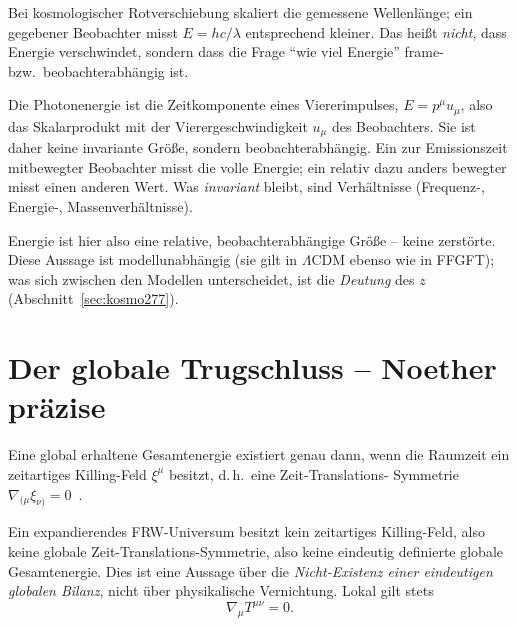 Bei kosmologischer Rotverschiebung skaliert die gemessene Wellenlänge; ein
gegebener Beobachter misst $E = hc/\lambda$ entsprechend kleiner. Das heißt
\emph{nicht}, dass Energie verschwindet, sondern dass die Frage \enquote{wie
viel Energie} frame- bzw.\ beobachterabhängig ist.

\begin{proposition}\label{prop:frame277}
Die Photonenergie ist die Zeitkomponente eines Viererimpulses,
$E = p^\mu u_\mu$, also das Skalarprodukt mit der Vierergeschwindigkeit $u_\mu$
des Beobachters. Sie ist daher keine invariante Größe, sondern
beobachterabhängig. Ein zur Emissionszeit mitbewegter Beobachter misst die
volle Energie; ein relativ dazu anders bewegter misst einen anderen Wert. Was
\emph{invariant} bleibt, sind Verhältnisse (Frequenz-, Energie-,
Massenverhältnisse).
\end{proposition}

Energie ist hier also eine relative, beobachterabhängige Größe -- keine
zerstörte. Diese Aussage ist modellunabhängig (sie gilt in $\Lambda$CDM ebenso
wie in FFGFT); was sich zwischen den Modellen unterscheidet, ist die
\emph{Deutung} des $z$ (Abschnitt~\ref{sec:kosmo277}).

\section{Der globale Trugschluss -- Noether präzise}

\begin{theorem}
\label{thm:noether277}
Eine global erhaltene Gesamtenergie existiert genau dann, wenn die Raumzeit ein
zeitartiges Killing-Feld $\xi^\mu$ besitzt, d.\,h.\ eine Zeit-Translations-%
Symmetrie $\nabla_{(\mu}\xi_{\nu)}=0$~\cite{noether1918,wald,mtw}.
\end{theorem}

Ein expandierendes FRW-Universum besitzt kein zeitartiges Killing-Feld, also
keine globale Zeit-Translations-Symmetrie, also keine eindeutig definierte
globale Gesamtenergie. Dies ist eine Aussage über die \emph{Nicht-Existenz
einer eindeutigen globalen Bilanz}, nicht über physikalische Vernichtung.
Lokal gilt stets
\begin{equation}
  \nabla_\mu T^{\mu\nu} = 0.
  \label{eq:covcons277}
\end{equation}

